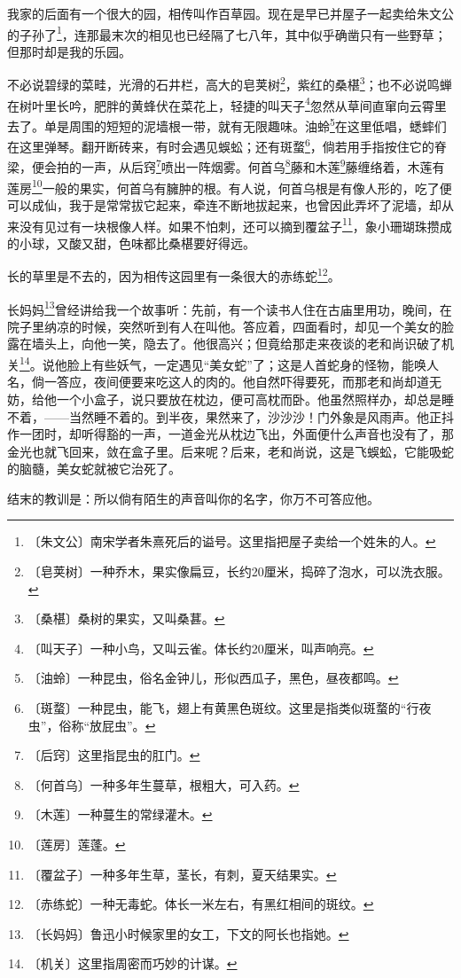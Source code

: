 \documentclass[12pt,UTF-8,openany]{ctexbook}
\begin{document}
\begin{large}
    
    我家的后面有一个很大的园，相传叫作百草园。现在是早已并屋子一起卖给朱文公的子孙了\footnote{〔朱文公〕南宋学者朱熹死后的谥号。这里指把屋子卖给一个姓朱的人。}，连那最末次的相见也已经隔了七八年，其中似乎确凿只有一些野草；但那时却是我的乐园。
    
    不必说碧绿的菜畦，光滑的石井栏，高大的皂荚树\footnote{〔皂荚树〕一种乔木，果实像扁豆，长约20厘米，捣碎了泡水，可以洗衣服。}，紫红的桑椹\footnote{〔桑椹〕桑树的果实，又叫桑葚。}；也不必说鸣蝉在树叶里长吟，肥胖的黄蜂伏在菜花上，轻捷的叫天子\footnote{〔叫天子〕一种小鸟，又叫云雀。体长约20厘米，叫声响亮。}忽然从草间直窜向云霄里去了。单是周围的短短的泥墙根一带，就有无限趣味。油蛉\footnote{〔油蛉〕一种昆虫，俗名金钟儿，形似西瓜子，黑色，昼夜都鸣。}在这里低唱，蟋蟀们在这里弹琴。翻开断砖来，有时会遇见蜈蚣；还有斑蝥\footnote{〔斑蝥〕一种昆虫，能飞，翅上有黄黑色斑纹。这里是指类似斑蝥的“行夜虫”，俗称“放屁虫”。}，倘若用手指按住它的脊梁，便会拍的一声，从后窍\footnote{〔后窍〕这里指昆虫的肛门。}喷出一阵烟雾。何首乌\footnote{〔何首乌〕一种多年生蔓草，根粗大，可入药。}藤和木莲\footnote{〔木莲〕一种蔓生的常绿灌木。}藤缠络着，木莲有莲房\footnote{〔莲房〕莲蓬。}一般的果实，何首乌有臃肿的根。有人说，何首乌根是有像人形的，吃了便可以成仙，我于是常常拔它起来，牵连不断地拔起来，也曾因此弄坏了泥墙，却从来没有见过有一块根像人样。如果不怕刺，还可以摘到覆盆子\footnote{〔覆盆子〕一种多年生草，茎长，有刺，夏天结果实。}，象小珊瑚珠攒成的小球，又酸又甜，色味都比桑椹要好得远。
    
    长的草里是不去的，因为相传这园里有一条很大的赤练蛇\footnote{〔赤练蛇〕一种无毒蛇。体长一米左右，有黑红相间的斑纹。}。
    
    长妈妈\footnote{〔长妈妈〕鲁迅小时候家里的女工，下文的阿长也指她。}曾经讲给我一个故事听：先前，有一个读书人住在古庙里用功，晚间，在院子里纳凉的时候，突然听到有人在叫他。答应着，四面看时，却见一个美女的脸露在墙头上，向他一笑，隐去了。他很高兴；但竟给那走来夜谈的老和尚识破了机关\footnote{〔机关〕这里指周密而巧妙的计谋。}。说他脸上有些妖气，一定遇见“美女蛇”了；这是人首蛇身的怪物，能唤人名，倘一答应，夜间便要来吃这人的肉的。他自然吓得要死，而那老和尚却道无妨，给他一个小盒子，说只要放在枕边，便可高枕而卧。他虽然照样办，却总是睡不着，——当然睡不着的。到半夜，果然来了，沙沙沙！门外象是风雨声。他正抖作一团时，却听得豁的一声，一道金光从枕边飞出，外面便什么声音也没有了，那金光也就飞回来，敛在盒子里。后来呢？后来，老和尚说，这是飞蜈蚣，它能吸蛇的脑髓，美女蛇就被它治死了。
    
    结末的教训是：所以倘有陌生的声音叫你的名字，你万不可答应他。
    

\end{large}
\end{document}
